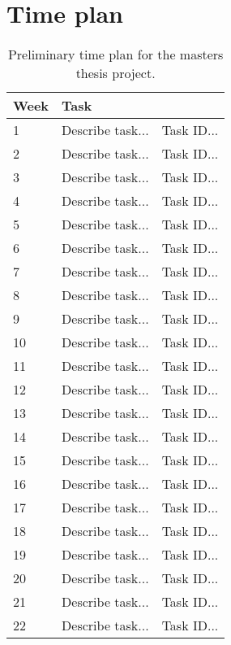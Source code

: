 \section{Time plan}



\begin{table}[h]
  \centering
  \begin{tabularx}{\textwidth}{|l|X|l|}
    \hline
    Week & Task & \\
    \hline
    1 & Describe task... & Task ID... \\
    2 & Describe task... & Task ID... \\
    3 & Describe task... & Task ID... \\
    4 & Describe task... & Task ID... \\
    5 & Describe task... & Task ID... \\
    6 & Describe task... & Task ID... \\
    7 & Describe task... & Task ID... \\
    8 & Describe task... & Task ID... \\
    9 & Describe task... & Task ID... \\
    10 & Describe task... & Task ID... \\
    11 & Describe task... & Task ID... \\
    12 & Describe task... & Task ID... \\
    13 & Describe task... & Task ID... \\
    14 & Describe task... & Task ID... \\
    15 & Describe task... & Task ID... \\
    16 & Describe task... & Task ID... \\
    17 & Describe task... & Task ID... \\
    18 & Describe task... & Task ID... \\
    19 & Describe task... & Task ID... \\
    20 & Describe task... & Task ID... \\
    21 & Describe task... & Task ID... \\
    22 & Describe task... & Task ID... \\
    \hline
  \end{tabularx}
  \caption{Preliminary time plan for the masters thesis project.}
  \label{timeline:time_plan}
\end{table}

